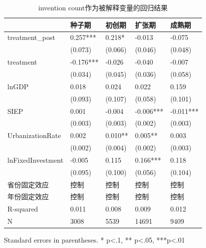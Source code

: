 \begin{table}
\caption{invention count作为被解释变量的回归结果}
\label{}
\begin{center}
\begin{tabular}{lllll}
\hline
                  & 种子期       & 初创期     & 扩张期       & 成熟期        \\
\hline
treatment\_post   & 0.257***  & 0.218*    & -0.013  & -0.075     \\
                  & (0.073)   & (0.066) & (0.046)   & (0.048)    \\
treatment         & -0.176*** & -0.026  & -0.040    & -0.007     \\
                  & (0.034)   & (0.045) & (0.036)   & (0.058)    \\
lnGDP             & 0.018     & 0.024   & 0.022     & 0.159      \\
                  & (0.093)   & (0.107) & (0.058)   & (0.101)    \\
SIEP            & 0.001     & -0.004  & -0.006*** & -0.011***  \\
                  & (0.003)   & (0.003) & (0.002)   & (0.003)    \\
UrbanizationRate              & 0.002     & 0.010** & 0.005**   & 0.003      \\
                  & (0.002)   & (0.004) & (0.002)   & (0.003)    \\
lnFixedInvestment & -0.005    & 0.115   & 0.166***  & 0.118      \\
                  & (0.095)   & (0.100) & (0.056)   & (0.104)    \\
省份固定效应  & 控制 & 控制 & 控制 & 控制  \\ 
 年份固定效应  & 控制 & 控制 & 控制 & 控制  \\ 
\hline

R-squared         & 0.011     & 0.008   & 0.009     & 0.012      \\
N                 & 3008      & 5539    & 14691     & 9409       \\
\hline
\end{tabular}
\end{center}
\end{table}
\bigskip
Standard errors in parentheses. \newline 
* p<.1, ** p<.05, ***p<.01

